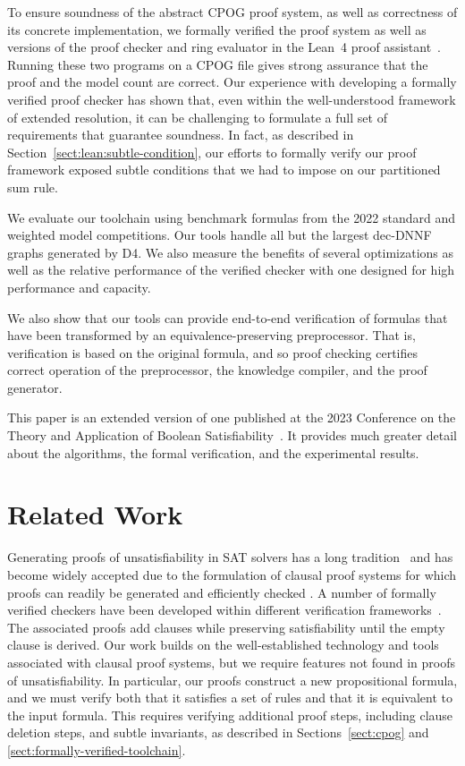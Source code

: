 \documentclass[twoside,11pt]{article}
\newcommand{\progname}[1]{\textsc{#1}}
\newcommand{\dfour}{\progname{D4}}
\newcommand{\lean}{Lean~4}
\begin{document}
To ensure soundness of the abstract CPOG proof system, as well as
correctness of its concrete implementation, we formally verified the
proof system as well as versions of the proof checker and ring
evaluator in the \lean{} proof assistant~\cite{demoura:cade:2021}.
Running these two programs on a  CPOG file gives strong
assurance that the proof and the model count are correct. Our
experience with developing a formally verified proof checker has shown
that, even within the well-understood framework of extended
resolution, it can be challenging to formulate a full set of
requirements that guarantee soundness.  In fact, as described in Section~\ref{sect:lean:subtle-condition}, our efforts to
formally verify our proof framework exposed subtle conditions that we had
to impose on our partitioned sum rule.  


We evaluate our toolchain using benchmark formulas from the 2022
standard and weighted model competitions.  Our tools handle all but
the largest dec-DNNF graphs generated by \dfour{}.  We also measure
the benefits of several optimizations as well as the relative
performance of the verified checker with one designed for high
performance and capacity.

We also show that our tools can provide end-to-end verification of
formulas that have been transformed by an equivalence-preserving
preprocessor.  That is, verification is based on the original formula,
and so proof checking certifies correct operation of the preprocessor,
the knowledge compiler, and the proof generator.

This paper is an extended version of one published at the 2023
Conference on the Theory and Application of Boolean
Satisfiability~\cite{bryant:sat:2023}.  It provides much greater detail about
the algorithms, the formal verification, and the experimental results.

\section{Related Work}


Generating proofs of unsatisfiability in SAT solvers has a long
tradition~\cite{ZhangMalik} and has become widely accepted due to the
formulation of clausal proof systems for which proofs can readily be
generated and efficiently checked
\cite{heule:cade:2013,wetzler14_drattrim}.
A number of formally verified checkers have been developed within different verification frameworks~\cite{cruz-cade-2017,lrat,Lammich:20,Tan:2021}.
The associated proofs add clauses while preserving satisfiability until the empty clause is derived.
Our work builds on the well-established technology and tools associated with clausal proof systems,
but we require features not found in proofs of unsatisfiability.
In particular, our proofs construct a new propositional formula, and we must verify
both
that it
satisfies a set of rules and that it
is equivalent to the input formula.  This requires verifying
additional proof steps, including clause deletion steps, and subtle
invariants, as described in Sections~\ref{sect:cpog} and
\ref{sect:formally-verified-toolchain}.
\end{document}
